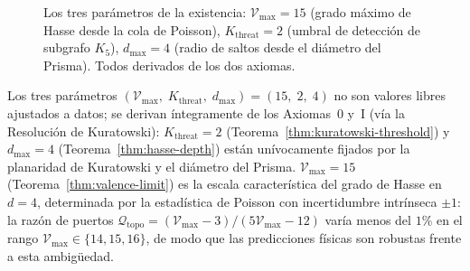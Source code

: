 \documentclass[11pt, a4paper, openany]{book}
\begin{document}
\begin{figure}[ht]
\centering
{}
\caption{Los tres par\'ametros de la existencia:
$\mathcal{V}_{\max} = 15$ (grado m\'aximo de Hasse desde la cola de
Poisson), $K_{\text{threat}} = 2$ (umbral de detecci\'on de subgrafo
$K_5$), $d_{\max} = 4$ (radio de saltos desde el di\'ametro del
Prisma). Todos derivados de los dos axiomas.}
\label{fig:three-constants}
\end{figure}

\begin{result}[title={Constantes Derivadas del Axioma~0 y el Axioma~I}]
\label{res:topological-constants}
Los tres par\'ametros $(\mathcal{V}_{\max},\; K_{\text{threat}},\;
d_{\max}) = (15,\; 2,\; 4)$ no son valores libres ajustados a datos;
se derivan \'integramente de los Axiomas~0 y~I (v\'ia la Resoluci\'on de Kuratowski):
$K_{\text{threat}} = 2$ (Teorema~\ref{thm:kuratowski-threshold}) y
$d_{\max} = 4$ (Teorema~\ref{thm:hasse-depth}) est\'an un\'ivocamente
fijados por la planaridad de Kuratowski y el di\'ametro del Prisma.
$\mathcal{V}_{\max} = 15$ (Teorema~\ref{thm:valence-limit}) es la
escala caracter\'istica del grado de Hasse en $d = 4$, determinada por
la estad\'istica de Poisson con incertidumbre intr\'inseca $\pm 1$: la
raz\'on de puertos $\mathcal{Q}_{\mathrm{topo}} = (\mathcal{V}_{\max}
- 3) / (5\mathcal{V}_{\max} - 12)$ var\'ia menos del $1\%$ en el rango
$\mathcal{V}_{\max} \in \{14, 15, 16\}$, de modo que las predicciones
f\'isicas son robustas frente a esta ambig\"uedad.
\end{result}
\end{document}
